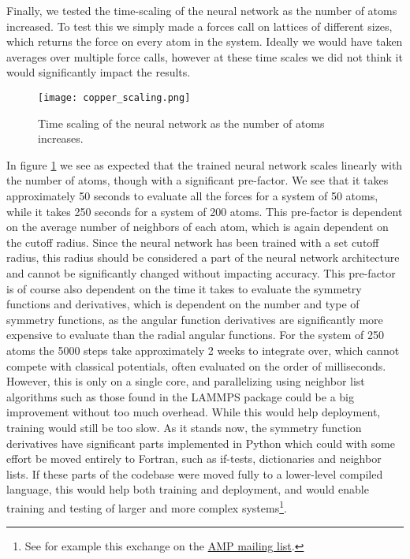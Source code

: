 Finally, we tested the time-scaling of the neural network as the number of atoms
increased. To test this we simply made a forces call on lattices of different
sizes, which returns the force on every atom in the system.
Ideally we would have taken averages over multiple force calls, however
at these time scales we did not think it would significantly impact the results.

\begin{figure}
\texttt{[image: copper\_scaling.png]}
\caption{Time scaling of the neural network as the number of atoms increases.}
\label{fig:copper-scaling}
\end{figure}

In figure \ref{fig:copper-scaling} we see as expected that the 
trained neural network
scales linearly with the number of atoms, though with a significant pre-factor.
We see that it takes approximately 50 seconds to evaluate all the forces
for a system of 50 atoms, while it takes 250 seconds for a system of 200 atoms.
This pre-factor is dependent on the average number of neighbors
of each atom, which is again dependent on the cutoff radius.
Since the neural network has been trained with a set cutoff radius,
this radius should be considered a part of the neural network architecture
and cannot be significantly changed without impacting accuracy.
This pre-factor is of course also dependent on the time it takes to evaluate
the symmetry functions and derivatives, which is dependent on the number
and type of symmetry functions, as the angular function derivatives are significantly
more expensive to evaluate than the radial angular functions.
For the system of 250 atoms the 5000 steps take approximately 2 weeks
to integrate over, which cannot compete with classical potentials,
often evaluated on the order of milliseconds.
However, this is only on a single core, 
and parallelizing using neighbor list algorithms
such as those found in the LAMMPS package 
could be a big improvement without too much overhead.
While this would help deployment, training would still be too slow.
As it stands now, the symmetry function derivatives have significant parts
implemented in Python which could with some effort be moved entirely to Fortran,
such as if-tests, dictionaries and neighbor lists.
If these parts of the codebase were moved fully to a lower-level compiled
language, this would help both training and deployment, and would enable
training and testing of larger and more complex systems\footnote{
    See for example this exchange on the \href{
    https://listserv.brown.edu/cgi-bin/wa?A2=AMP-USERS;d7c6c98c.1904}{
    AMP mailing list}.}.

